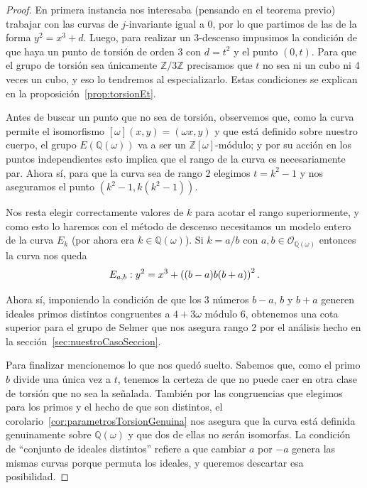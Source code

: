 \documentclass[a4paper]{book}
\theoremstyle{definition}
\theoremstyle{plain}
\newcommand{\nbd}{\nobreakdash}
\newcommand{\QQ}{\mathbb{Q}}
\newcommand{\ZZ}{\mathbb{Z}}
\newcommand{\OO}{\mathcal{O}}
\newcommand{\lp}{\left\lparen}
\newcommand{\rp}{\right\rparen}
\begin{document}
\begin{proof}
En primera instancia nos interesaba (pensando en el teorema previo) trabajar con las curvas de $j$\nbd-invariante igual a 0, por lo que partimos de las de la forma $y^2=x^3+d$. Luego, para realizar un 3\nbd-descenso impusimos la condición de que haya un punto de torsión de orden 3 con $d=t^2$ y el punto $(0,t)$. Para que el grupo de torsión sea únicamente $\ZZ /3\ZZ$ precisamos que $t$ no sea ni un cubo ni 4 veces un cubo, y eso lo tendremos al especializarlo. Estas condiciones se explican en la proposición~\ref{prop:torsionEt}.

Antes de buscar un punto que no sea de torsión, observemos que, como la curva permite el isomorfismo $[\omega](x,y)=(\omega x,y)$ y que está definido sobre nuestro cuerpo, el grupo $E(\QQ(\omega))$ va a ser un $\ZZ[\omega]$\nbd-módulo; y por su acción en los puntos independientes esto implica que el rango de la curva es necesariamente par. Ahora sí, para que la curva sea de rango 2 elegimos $t=k^2-1$ y nos aseguramos el punto $(k^2-1, k(k^2-1))$. 

Nos resta elegir correctamente valores de $k$ para acotar el rango superiormente, y como esto lo haremos con el método de descenso necesitamos un modelo entero de la curva $E_k$ (por ahora era $k\in \QQ(\omega)$). Si $k=a/b$ con $a,b\in \OO_{\QQ(\omega)}$ entonces la curva nos queda
\[
E_{a,b}:y^2=x^3+\lp (b-a)b(b+a)\rp^2.
\] 

Ahora sí, imponiendo la condición de que los 3 números $b-a$, $b$ y $b+a$ generen ideales primos distintos congruentes a $4+3\omega$ módulo 6, obtenemos una cota superior para el grupo de Selmer que nos asegura rango 2 por el análisis hecho en la sección~\ref{sec:nuestroCasoSeccion}.

Para finalizar mencionemos lo que nos quedó suelto. Sabemos que, como el primo $b$ divide una única vez a $t$, tenemos la certeza de que no puede caer en otra clase de torsión que no sea la señalada. También por las congruencias que elegimos para los primos y el hecho de que son distintos, el corolario~\ref{cor:parametrosTorsionGenuina} nos asegura que la curva está definida genuinamente sobre $\QQ(\omega)$ y que dos de ellas no serán isomorfas. La condición de ``conjunto de ideales distintos'' refiere a que cambiar $a$ por $-a$ genera las mismas curvas porque permuta los ideales, y queremos descartar esa posibilidad.
\end{proof}
\end{document}
